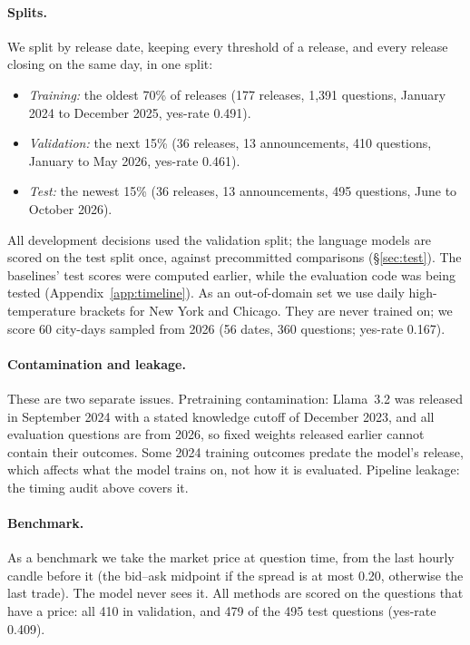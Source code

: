 \documentclass[11pt]{article}
\begin{document}
\paragraph{Splits.} We split by release date, keeping every threshold of a release, and every release closing on the same day, in one split:
\begin{itemize}[leftmargin=*]
\item \emph{Training:} the oldest 70\% of releases (177 releases, 1,391 questions, January 2024 to December 2025, yes-rate 0.491).
\item \emph{Validation:} the next 15\% (36 releases, 13 announcements, 410 questions, January to May 2026, yes-rate 0.461).
\item \emph{Test:} the newest 15\% (36 releases, 13 announcements, 495 questions, June to October 2026).
\end{itemize}
All development decisions used the validation split; the language models are scored on the test split once, against precommitted comparisons (\S\ref{sec:test}). The baselines' test scores were computed earlier, while the evaluation code was being tested (Appendix~\ref{app:timeline}). As an out-of-domain set we use daily high-temperature brackets for New York and Chicago. They are never trained on; we score 60 city-days sampled from 2026 (56 dates, 360 questions; yes-rate 0.167).

\paragraph{Contamination and leakage.} These are two separate issues. Pretraining contamination: Llama~3.2 was released in September 2024 with a stated knowledge cutoff of December 2023, and all evaluation questions are from 2026, so fixed weights released earlier cannot contain their outcomes. Some 2024 training outcomes predate the model's release, which affects what the model trains on, not how it is evaluated. Pipeline leakage: the timing audit above covers it.

\paragraph{Benchmark.} As a benchmark we take the market price at question time, from the last hourly candle before it (the bid--ask midpoint if the spread is at most 0.20, otherwise the last trade). The model never sees it. All methods are scored on the questions that have a price: all 410 in validation, and 479 of the 495 test questions (yes-rate 0.409).
\end{document}

